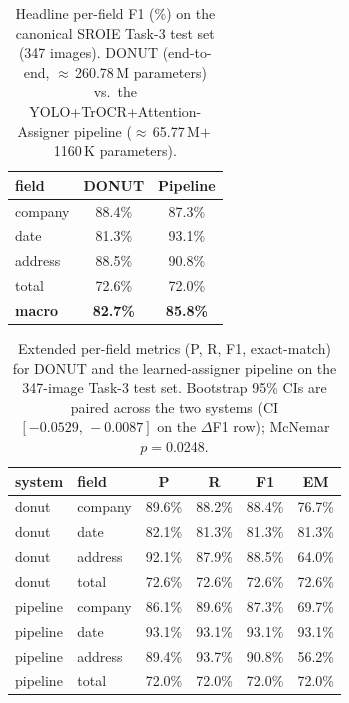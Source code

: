 \documentclass[conference]{IEEEtran}
\begin{document}
\begin{table}[t]
\centering
\caption{Headline per-field F1 (\%) on the canonical SROIE Task-3
         test set (347 images).  DONUT (end-to-end,
         $\approx$\,260.78\,M parameters) vs.\ the
         YOLO+TrOCR+Attention-Assigner pipeline
         ($\approx$\,65.77\,M$+$\,1160\,K
         parameters).}
\label{tab:headline_f1}
\small
\begin{tabular}{lcc}
\toprule
field & DONUT & Pipeline \\
\midrule
company & 88.4\% & 87.3\% \\
date & 81.3\% & 93.1\% \\
address & 88.5\% & 90.8\% \\
total & 72.6\% & 72.0\% \\
\textbf{macro} & \textbf{82.7\%} & \textbf{85.8\%} \\
\bottomrule
\end{tabular}
\end{table}

\begin{table}[t]
\centering
\caption{Extended per-field metrics (P, R, F1, exact-match) for
         DONUT and the learned-assigner pipeline on the
         347-image Task-3 test set.  Bootstrap 95\% CIs are
         paired across the two systems
         (CI $[-0.0529,\,-0.0087]$ on the
         $\Delta$F1 row); McNemar $p=$0.0248.}
\label{tab:extended}
\scriptsize
\begin{tabular}{llcccc}
\toprule
system & field & P & R & F1 & EM \\
\midrule
donut & company & 89.6\% & 88.2\% & 88.4\% & 76.7\% \\
donut & date & 82.1\% & 81.3\% & 81.3\% & 81.3\% \\
donut & address & 92.1\% & 87.9\% & 88.5\% & 64.0\% \\
donut & total & 72.6\% & 72.6\% & 72.6\% & 72.6\% \\
pipeline & company & 86.1\% & 89.6\% & 87.3\% & 69.7\% \\
pipeline & date & 93.1\% & 93.1\% & 93.1\% & 93.1\% \\
pipeline & address & 89.4\% & 93.7\% & 90.8\% & 56.2\% \\
pipeline & total & 72.0\% & 72.0\% & 72.0\% & 72.0\% \\
\bottomrule
\end{tabular}
\end{table}
\end{document}
